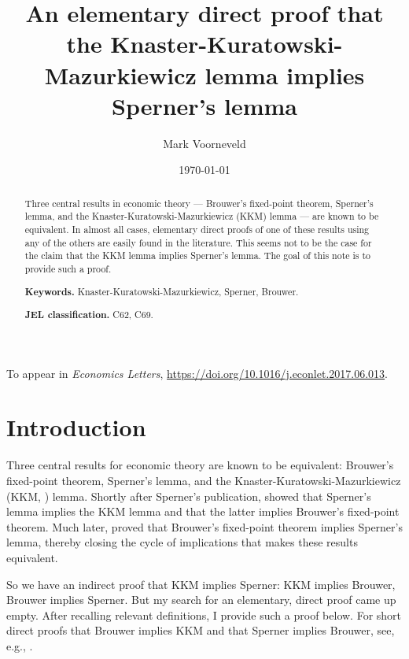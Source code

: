 \documentclass[english, 11pt]{article}
\theoremstyle{plain} %
\begin{document}
\title{\large\textbf{An elementary direct proof that the Knaster-Kuratowski-Mazurkiewicz lemma implies Sperner's lemma}}
\author{\textsc\normalsize Mark Voorneveld}

\date{\small \today}
\maketitle

\begin{abstract}
Three central results in economic theory --- Brouwer's fixed-point theorem, Sperner's lemma, and the Knaster-Kuratowski-Mazurkiewicz (KKM) lemma --- are known to be equivalent. In almost all cases, elementary direct proofs of one of these results using any of the others are easily found in the literature. This seems not to be the case for the claim that the KKM lemma implies Sperner's lemma. The goal of this note is to provide such a proof.

\medskip
\noindent \textbf{Keywords.} Knaster-Kuratowski-Mazurkiewicz, Sperner, Brouwer.

\noindent \textbf{JEL classification.} C62, C69.
\end{abstract}

\bigskip
\begin{center}
To appear in \textit{Economics Letters}, \url{https://doi.org/10.1016/j.econlet.2017.06.013}.
\end{center}

\newpage
\section{Introduction}

Three central results for economic theory are known to be equivalent: Brouwer's \citeyearpar{Brouwer1911} fixed-point theorem, Sperner's \citeyearpar{Sperner1928} lemma, and the Knaster-Kuratowski-Mazurkiewicz (KKM, \citeyear{KKM1929}) lemma. Shortly after Sperner's publication, \citet[\S 3--4]{KKM1929} showed that Sperner's lemma implies the KKM lemma and that the latter implies Brouwer's fixed-point theorem. Much later, \citet[Thm.~1]{Yoseloff1974} proved that Brouwer's fixed-point theorem implies Sperner's lemma, thereby closing the cycle of implications that makes these results equivalent.

So we have an indirect proof that KKM implies Sperner: KKM implies Brouwer, Brouwer implies Sperner. But my search for an elementary, direct proof came up empty. After recalling relevant definitions, I provide such a proof below. For short direct proofs that Brouwer implies KKM and that Sperner implies Brouwer, see, e.g., \citet[p. 44 and 28]{Border1985}.
\end{document}
